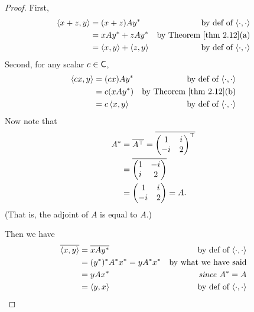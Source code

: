 \begin{proof}
First,
\begin{align*}
    \LG x + z, y \RG & = (x + z) A y^* & \text{by def of \(\InnerOp\)} \\
        & = x A y^* + z A y^* & \text{by \THM{2.12}(a)} \\
        & = \LG x, y \RG + \LG z, y \RG & \text{by def of \(\InnerOp\)}
\end{align*}
Second, for any scalar \(c \in \textsf{C}\),
\begin{align*}
    \LG cx, y \RG & = (cx) A y^* & \text{by def of \(\InnerOp\)} \\
        & = c(x A y^*) & \text{by \THM{2.12}(b)} \\
        & = c\LG x, y \RG & \text{by def of \(\InnerOp\)}
\end{align*}
Now note that
\begin{align*}
    A^* & = \overline{A^\top} = \overline{\begin{pmatrix} 1 & {i\mkern1mu} \\ -{i\mkern1mu} & 2 \end{pmatrix}^\top} \\
        & = \overline{\begin{pmatrix} 1 & -{i\mkern1mu} \\ {i\mkern1mu} & 2 \end{pmatrix}} \\
        & = \begin{pmatrix} 1 & {i\mkern1mu} \\ -{i\mkern1mu} & 2 \end{pmatrix} = A.
\end{align*}
(That is, the adjoint of \(A\) is equal to \(A\).)

Then we have
\begin{align*}
    \overline{\left< x, y \right>} & = \overline{x A y^*} & \text{by def of \(\left<\cdot, \cdot \right>\)} \\
        & = (y^*)^* A^* x^* = y A^* x^* & \text{by what we have said} \\
        & = y A x^* & \text{\emph{since} \(A^* = A\)} \\
        & = \left< y, x \right> & \text{by def of \(\left<\cdot, \cdot \right>\)}
\end{align*}


\end{proof}
